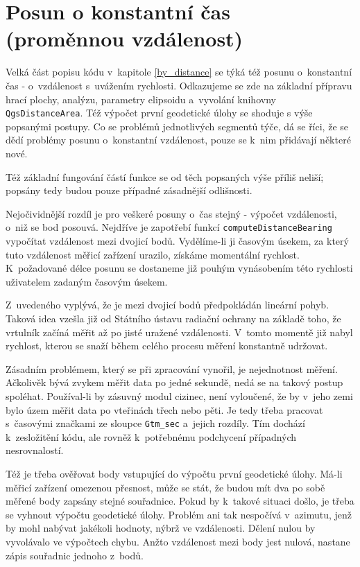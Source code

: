\section{Posun o konstantní čas (proměnnou vzdálenost)}
\label{by_seconds}

Velká část popisu kódu v~kapitole \ref{by_distance} se týká též posunu o~konstantní
čas - o~vzdále\-nost s~uvážením rychlosti. Odkazujeme se zde na základní přípravu hrací plochy,
analýzu, parametry elipsoidu a~vyvolání knihovny {\tt QgsDistanceArea}. Též výpočet první geodetické
úlohy se shoduje s výše popsanými postupy. Co se problémů jednotlivých
segmentů týče, dá se říci, že se dědí problémy posunu o~konstantní vzdálenost, pouze se k~nim
přidávají některé nové. 

Též základní fungování částí funkce se od těch popsaných výše příliš neliší; po\-psány tedy
budou pouze případné zásadnější odlišnosti. 

Nejočividnější rozdíl je pro veškeré posuny o~čas stejný - výpočet vzdálenosti,
o~niž se bod posouvá. Nejdříve je zapotřebí funkcí {\tt computeDistanceBearing}
vypočítat vzdálenost mezi dvojicí bodů. Vydělíme-li ji časovým úsekem, za který tuto vzdálenost
měřicí zařízení urazilo, získáme momentální rychlost. K~požadované délce posunu
se dostaneme již pouhým vynásobením této rychlosti uživatelem zadaným časovým úsekem. 

Z~uvedeného vyplývá, že je mezi dvojicí bodů předpokládán lineární pohyb. Taková idea vzešla
již od Státního ústavu radiační ochrany na základě toho, že vrtulník začíná měřit
až po jisté uražené vzdálenosti. V~tomto momentě již nabyl rychlost, kterou se snaží během
celého procesu měření konstantně udržovat. 

Zásadním problémem, který se při zpracování vynořil, je nejednotnost měření.
Ačkolivěk bývá zvykem měřit data po jedné sekundě, nedá se na takový postup spoléhat.
Používal-li by zásuvný modul cizinec, není vyloučené, že by v~jeho zemi bylo územ měřit
data po vteřinách třech nebo pěti. Je tedy třeba pracovat s~časovými značkami ze sloupce
{\tt Gtm\_sec} a~jejich rozdíly. Tím dochází k~zesložitění kódu, ale rovněž k~potřebnému
podchycení případných nesrovnalostí. 

Též je třeba ověřovat body vstupující do výpočtu první geodetické úlohy. Má-li měřicí zařízení
omezenou přesnost, může se stát, že budou mít dva po sobě měřené body zapsány stejné souřadnice.
Pokud by k~takové situaci došlo, je třeba se vyhnout výpočtu geodetické úlohy. Problém ani
tak nespočívá v~azimutu, jenž by mohl nabývat jakékoli hodnoty, nýbrž ve vzdálenosti.
Dělení nulou by vyvolávalo ve výpočtech chybu. Anžto vzdálenost mezi body jest nulová,
nastane zápis souřadnic jednoho z~bodů. 

